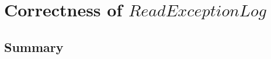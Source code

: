 \chapter[$ReadExceptionLog$]{Correctness of $ReadExceptionLog$}\label{ch21}

\newpage
\section{Summary}\label{ch21.summary}

\ldefsummary %
\lthmsummary %
\lthmaddeddefsummary %
\lthmaddedthmsummary %
\lzevessummary %
